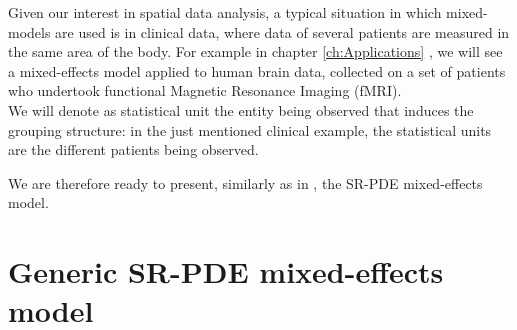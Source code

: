 Given our interest in spatial data analysis, a typical situation in which
mixed-models are used is in clinical data, where data of several patients are
measured in the same area of the body. For example in chapter
\ref{ch:Applications} , we will see a mixed-effects
model applied to human brain data, collected on a set of patients who undertook
functional Magnetic Resonance Imaging (fMRI).\\ We will denote as statistical
unit the entity being observed that induces the grouping structure: in the just
mentioned clinical example, the statistical units are the different patients
being observed.

We are therefore ready to present, similarly as in \cite{kim}, the SR-PDE
mixed-effects model.

\section{Generic SR-PDE mixed-effects model}

